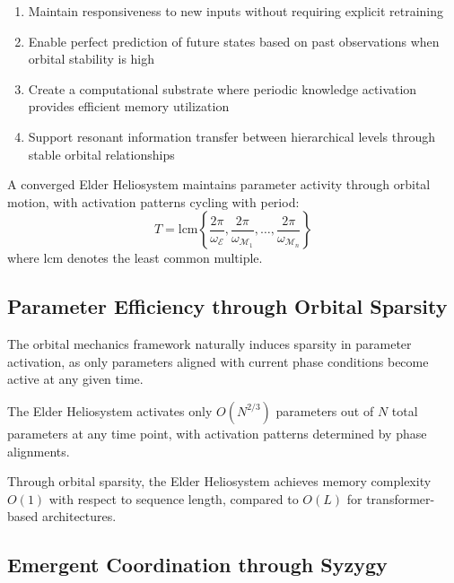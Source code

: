 \begin{enumerate}
    \item Maintain responsiveness to new inputs without requiring explicit retraining
    \item Enable perfect prediction of future states based on past observations when orbital stability is high
    \item Create a computational substrate where periodic knowledge activation provides efficient memory utilization
    \item Support resonant information transfer between hierarchical levels through stable orbital relationships
\end{enumerate}

\begin{theorem}
A converged Elder Heliosystem maintains parameter activity through orbital motion, with activation patterns cycling with period:
\begin{equation}
T = \text{lcm}\left\{\frac{2\pi}{\omega_{\mathcal{E}}}, \frac{2\pi}{\omega_{\mathcal{M}_1}}, \ldots, \frac{2\pi}{\omega_{\mathcal{M}_n}}\right\}
\end{equation}
where $\text{lcm}$ denotes the least common multiple.
\end{theorem}

\subsection{Parameter Efficiency through Orbital Sparsity}

The orbital mechanics framework naturally induces sparsity in parameter activation, as only parameters aligned with current phase conditions become active at any given time.

\begin{proposition}
The Elder Heliosystem activates only $O(N^{2/3})$ parameters out of $N$ total parameters at any time point, with activation patterns determined by phase alignments.
\end{proposition}

\begin{corollary}
Through orbital sparsity, the Elder Heliosystem achieves memory complexity $O(1)$ with respect to sequence length, compared to $O(L)$ for transformer-based architectures.
\end{corollary}

\subsection{Emergent Coordination through Syzygy}


